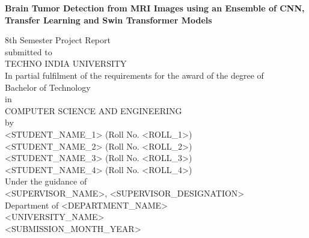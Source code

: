 \documentclass[12pt,a4paper,oneside]{report}
\begin{document}
\begin{titlepage}
\centering
\vspace*{1.5cm}
{\LARGE\bfseries Brain Tumor Detection from MRI Images using an Ensemble of CNN, Transfer Learning and Swin Transformer Models\par}
\vspace{1.2cm}
8th Semester Project Report\\[4pt]
submitted to\\[4pt]
TECHNO INDIA UNIVERSITY\\[4pt]
In partial fulfilment of the requirements for the award of the degree of\\[4pt]
Bachelor of Technology\\[4pt]
in\\[4pt]
COMPUTER SCIENCE AND ENGINEERING\\[4pt]
by\\[4pt]
<STUDENT\_NAME\_1> (Roll No. <ROLL\_1>)\\[4pt]
<STUDENT\_NAME\_2> (Roll No. <ROLL\_2>)\\[4pt]
<STUDENT\_NAME\_3> (Roll No. <ROLL\_3>)\\[4pt]
<STUDENT\_NAME\_4> (Roll No. <ROLL\_4>)\\[4pt]
Under the guidance of\\[4pt]
<SUPERVISOR\_NAME>, <SUPERVISOR\_DESIGNATION>\\[4pt]
Department of <DEPARTMENT\_NAME>\\[4pt]
<UNIVERSITY\_NAME>\\[4pt]
<SUBMISSION\_MONTH\_YEAR>\\[4pt]
\end{titlepage}
\tableofcontents
\listoffigures
\clearpage
{}
\end{document}

